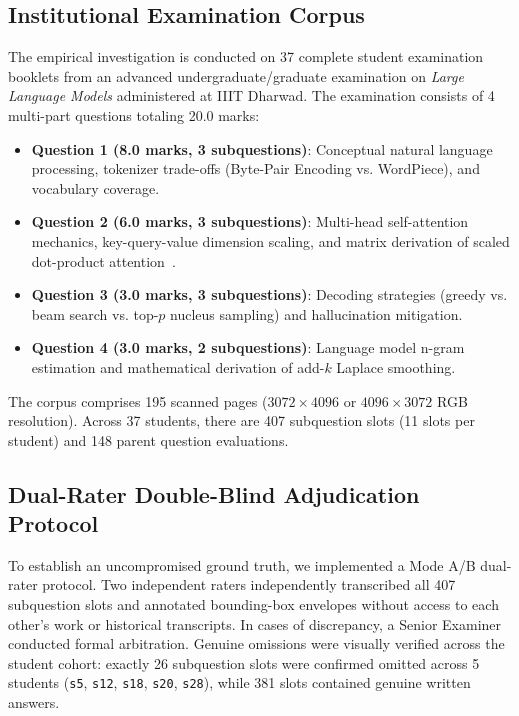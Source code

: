 \documentclass[journal]{IEEEtran}
\begin{document}
\subsection{Institutional Examination Corpus}
The empirical investigation is conducted on 37 complete student examination booklets from an advanced undergraduate/graduate examination on \textit{Large Language Models} administered at IIIT Dharwad. The examination consists of 4 multi-part questions totaling 20.0 marks:
\begin{itemize}
    \item \textbf{Question 1 (8.0 marks, 3 subquestions)}: Conceptual natural language processing, tokenizer trade-offs (Byte-Pair Encoding vs. WordPiece), and vocabulary coverage.
    \item \textbf{Question 2 (6.0 marks, 3 subquestions)}: Multi-head self-attention mechanics, key-query-value dimension scaling, and matrix derivation of scaled dot-product attention~\cite{vaswani2017attention}.
    \item \textbf{Question 3 (3.0 marks, 3 subquestions)}: Decoding strategies (greedy vs. beam search vs. top-$p$ nucleus sampling) and hallucination mitigation.
    \item \textbf{Question 4 (3.0 marks, 2 subquestions)}: Language model n-gram estimation and mathematical derivation of add-$k$ Laplace smoothing.
\end{itemize}
The corpus comprises 195 scanned pages ($3072 \times 4096$ or $4096 \times 3072$ RGB resolution). Across 37 students, there are 407 subquestion slots (11 slots per student) and 148 parent question evaluations.

\subsection{Dual-Rater Double-Blind Adjudication Protocol}
To establish an uncompromised ground truth, we implemented a Mode A/B dual-rater protocol. Two independent raters independently transcribed all 407 subquestion slots and annotated bounding-box envelopes without access to each other's work or historical transcripts. In cases of discrepancy, a Senior Examiner conducted formal arbitration. Genuine omissions were visually verified across the student cohort: exactly 26 subquestion slots were confirmed omitted across 5 students (\texttt{s5}, \texttt{s12}, \texttt{s18}, \texttt{s20}, \texttt{s28}), while 381 slots contained genuine written answers.
\end{document}

